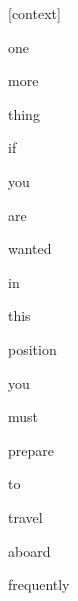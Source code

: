 \documentclass[varwidth]{standalone}
\begin{document}
\begin{CJK*}{UTF8}{gbsn}
{\setlength{\fboxsep}{0pt}\colorbox{white!0}{\parbox{0.9\textwidth}{
\colorbox{red!1.646310854568761e-13}{\strut [context]} \colorbox{red!4.679568377241594e-08}{\strut one} \colorbox{red!6.006842454553407e-07}{\strut more} \colorbox{red!0.028890952467918396}{\strut thing} \colorbox{red!0.14666049182415009}{\strut if} \colorbox{red!0.31471940875053406}{\strut you} \colorbox{red!0.03290582820773125}{\strut are} \colorbox{red!0.08246498554944992}{\strut wanted} \colorbox{red!1.1801940202713013}{\strut in} \colorbox{red!0.2825806736946106}{\strut this} \colorbox{red!10.630087852478027}{\strut position} \colorbox{red!13.014819145202637}{\strut you} \colorbox{red!29.14065170288086}{\strut must} \colorbox{red!0.7025144100189209}{\strut prepare} \colorbox{red!0.82301926612854}{\strut to} \colorbox{red!1.0815000534057617}{\strut travel} \colorbox{red!0.08675287663936615}{\strut aboard} \colorbox{red!42.45223617553711}{\strut frequently} 
}}}
\end{CJK*}
\end{document}
